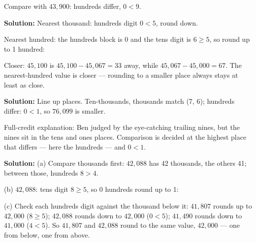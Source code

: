 \documentclass[12pt]{article}
\begin{document}
Compare with $43{,}900$: hundreds differ, $0 < 9$.


\textbf{Solution:} Nearest thousand: hundreds digit $0 < 5$, round down.

Nearest hundred: the hundreds block is 0 and the tens digit is $6 \geq 5$, so
round up to 1 hundred: 

Closer: $45{,}100$ is $45{,}100 - 45{,}067 = 33$ away, while $45{,}067 -
45{,}000 = 67$. The nearest-hundred value is closer — rounding to a smaller
place always stays at least as close.


\textbf{Solution:} Line up places. Ten-thousands, thousands match (7, 6);
hundreds differ: $0 < 1$, so $76{,}099$ is smaller.

Full-credit explanation: Ben judged by the eye-catching trailing nines, but the
nines sit in the tens and ones places. Comparison is decided at the highest
place that differs — here the hundreds — and $0 < 1$.


\textbf{Solution:} (a) Compare thousands first: $42{,}088$ has 42 thousands,
the others 41; between those, hundreds $8 > 4$.

(b) $42{,}088$: tens digit $8 \geq 5$, so 0 hundreds round up to 1:

(c) Check each hundreds digit against the thousand below it: $41{,}807$ rounds
up to $42{,}000$ ($8 \geq 5$); $42{,}088$ rounds down to $42{,}000$ ($0 < 5$);
$41{,}490$ rounds down to $41{,}000$ ($4 < 5$). So $41{,}807$ and $42{,}088$
round to the same value, $42{,}000$ — one from below, one from above.
\end{document}
